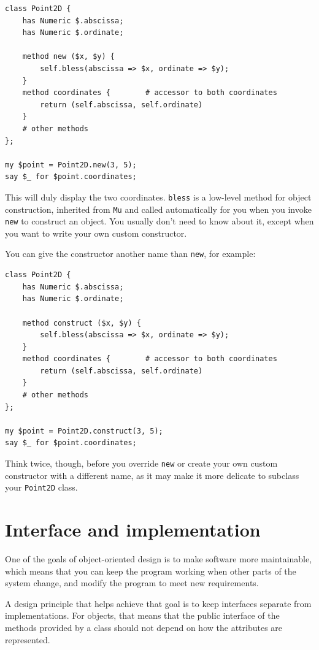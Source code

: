 \begin{verbatim}
class Point2D {
    has Numeric $.abscissa;
    has Numeric $.ordinate;

    method new ($x, $y) {
    	self.bless(abscissa => $x, ordinate => $y);
    }
    method coordinates {        # accessor to both coordinates
        return (self.abscissa, self.ordinate)
    }
    # other methods
};

my $point = Point2D.new(3, 5);
say $_ for $point.coordinates;
\end{verbatim}

This will duly display the two coordinates. {\tt bless} is a 
low-level method for object construction, inherited from 
{\tt Mu} and called automatically for you when you invoke 
{\tt new} to construct an object. You usually don't need 
to know about it, except when you want to write your own custom 
constructor.

You can give the constructor another name than {\tt new}, for example:

\begin{verbatim}
class Point2D {
    has Numeric $.abscissa;
    has Numeric $.ordinate;

    method construct ($x, $y) {
    	self.bless(abscissa => $x, ordinate => $y);
    }
    method coordinates {        # accessor to both coordinates
        return (self.abscissa, self.ordinate)
    }
    # other methods
};

my $point = Point2D.construct(3, 5);
say $_ for $point.coordinates;
\end{verbatim}

Think twice, though, before you override {\tt new} or create your 
own custom constructor with a different name, as it may make it 
more delicate to subclass your {\tt Point2D} class.



\section{Interface and implementation}

One of the goals of object-oriented design is to make software more
maintainable, which means that you can keep the program working when
other parts of the system change, and modify the program to meet new
requirements.

A design principle that helps achieve that goal is to keep
interfaces separate from implementations.  For objects, that means
that the public interface of the methods provided by a class 
should not depend on how the attributes are represented.


